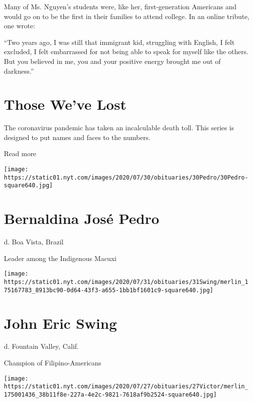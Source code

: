 Many of Ms. Nguyen's students were, like her, first-generation Americans
and would go on to be the first in their families to attend college. In
an online tribute, one wrote:

``Two years ago, I was still that immigrant kid, struggling with
English, I felt excluded, I felt embarrassed for not being able to speak
for myself like the others. But you believed in me, you and your
positive energy brought me out of darkness.''

\href{https://www.nytimes.com/interactive/2020/obituaries/people-died-coronavirus-obituaries.html?action=click\&pgtype=Article\&state=default\&region=BELOW_MAIN_CONTENT\&context=covid_obits_promo}{}

\hypertarget{those-weve-lost}{%
\section{Those We've Lost}\label{those-weve-lost}}

The coronavirus pandemic has taken an incalculable death toll. This
series is designed to put names and faces to the numbers.

Read more

\texttt{[image: https://static01.nyt.com/images/2020/07/30/obituaries/30Pedro/30Pedro-square640.jpg]}

\hypertarget{bernaldina-josuxe9-pedro}{%
\section{Bernaldina José Pedro}\label{bernaldina-josuxe9-pedro}}

d. Boa Vista, Brazil

Leader among the Indigenous Macuxi

\texttt{[image: https://static01.nyt.com/images/2020/07/31/obituaries/31Swing/merlin\_175167783\_8913bc90-0d64-43f3-a655-1bb1bf1601c9-square640.jpg]}

\hypertarget{john-eric-swing}{%
\section{John Eric Swing}\label{john-eric-swing}}

d. Fountain Valley, Calif.

Champion of Filipino-Americans

\texttt{[image: https://static01.nyt.com/images/2020/07/27/obituaries/27Victor/merlin\_175001436\_38b11f8e-227a-4e2c-9821-7618af9b2524-square640.jpg]}

